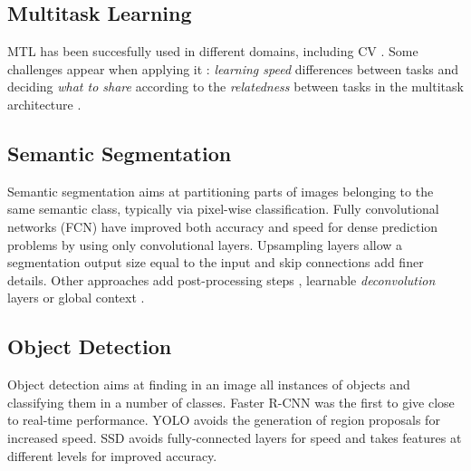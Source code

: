 \subsection{Multitask Learning}

MTL has been succesfully used in different domains, including CV \cite{UberNet,MaskRCNN}. Some challenges appear when applying it \cite{Caruana}: \textit{learning speed} differences between tasks and  deciding \textit{what to share} according to the \textit{relatedness} between tasks in the multitask architecture \cite{Stitch, AdaptiveFeatureSharing}.

\subsection{Semantic Segmentation}

Semantic segmentation aims at partitioning parts of images belonging to the same semantic class, typically via pixel-wise classification. Fully convolutional networks (FCN) \cite{FCN} have improved both accuracy and speed for dense prediction problems by using only convolutional layers. Upsampling layers allow a segmentation output size equal to the input and skip connections add finer details. Other approaches add post-processing steps \cite{DeeplabCRF}, learnable \textit{deconvolution} layers \cite{ Deconv} or global context \cite{ParseNet}.

\subsection{Object Detection}

Object detection aims at finding in an image all instances of objects and classifying them in a number of classes. Faster R-CNN \cite{FasterRCNN} was the first to give close to real-time performance. YOLO \cite{YOLO} avoids the generation of region proposals for increased speed. SSD \cite{SSD} avoids fully-connected layers for speed and takes features at different levels for improved accuracy. 

